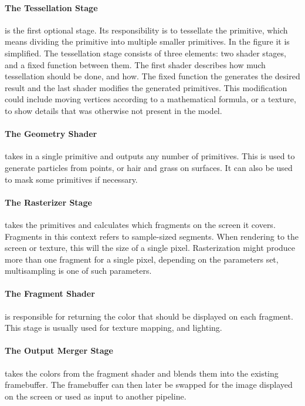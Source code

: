 \paragraph{The Tessellation Stage} is the first optional stage.
Its responsibility is to tessellate the primitive, which means dividing the primitive into multiple smaller primitives.
In the figure it is simplified.
The tessellation stage consists of three elements: two shader stages, and a fixed function between them.
The first shader describes how much tessellation should be done, and how.
The fixed function the generates the desired result and the last shader modifies the generated primitives.
This modification could include moving vertices according to a mathematical formula, or a texture, to show details that was otherwise not present in the model.

\paragraph{The Geometry Shader} takes in a single primitive and outputs any number of primitives.
This is used to generate particles from points, or hair and grass on surfaces.
It can also be used to mask some primitives if necessary.


\paragraph{The Rasterizer Stage} takes the primitives and calculates which fragments on the screen it covers.
Fragments in this context refers to sample-sized segments.
When rendering to the screen or texture, this will the size of a single pixel.
Rasterization might produce more than one fragment for a single pixel, depending on the parameters set, multisampling is one of such parameters.

\paragraph{The Fragment Shader} is responsible for returning the color that should be displayed on each fragment.
This stage is usually used for texture mapping, and lighting.

\paragraph{The Output Merger Stage} takes the colors from the fragment shader and blends them into the existing framebuffer. 
The framebuffer can then later be swapped for the image displayed on the screen or used as input to another pipeline.

